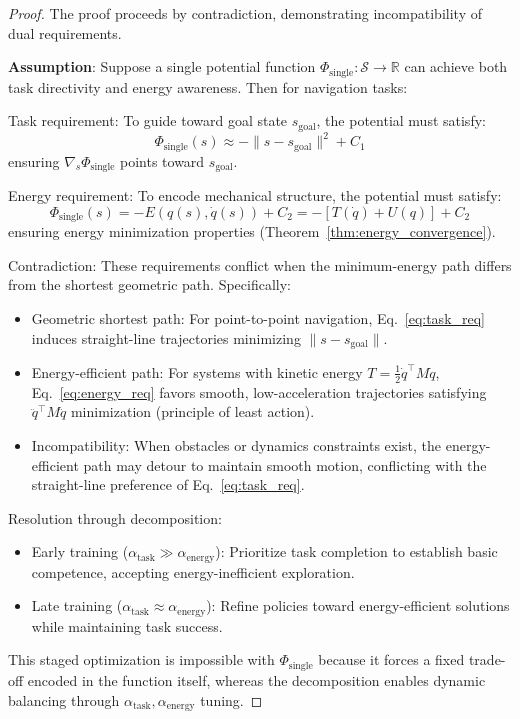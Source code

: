 \documentclass[10pt,a4paper]{amsart}
\begin{document}
	\begin{proof}
		The proof proceeds by contradiction, demonstrating incompatibility of dual requirements.
		
		\textbf{Assumption}: Suppose a single potential function $\Phi_{\text{single}}:\mathcal{S}\to\mathbb{R}$ can achieve both task directivity and energy awareness. Then for navigation tasks:
		
		Task requirement: To guide toward goal state $s_{\text{goal}}$, the potential must satisfy:
		\begin{equation}
			\Phi_{\text{single}}(s) \approx -\|s - s_{\text{goal}}\|^2 + C_1
			\label{eq:task_req}
		\end{equation}
		ensuring $\nabla_s \Phi_{\text{single}}$ points toward $s_{\text{goal}}$.
		
		Energy requirement: To encode mechanical structure, the potential must satisfy:
		\begin{equation}
			\Phi_{\text{single}}(s) = -E(q(s),\dot{q}(s)) + C_2 = -\left[T(\dot{q}) + U(q)\right] + C_2
			\label{eq:energy_req}
		\end{equation}
		ensuring energy minimization properties (Theorem~\ref{thm:energy_convergence}).
		
		Contradiction: These requirements conflict when the minimum-energy path differs from the shortest geometric path. Specifically:
		
		\begin{itemize}
			\item Geometric shortest path: For point-to-point navigation, Eq.~\eqref{eq:task_req} induces straight-line trajectories minimizing $\|s-s_{\text{goal}}\|$.
			
			\item Energy-efficient path: For systems with kinetic energy $T=\frac{1}{2}\dot{q}^\top M\dot{q}$, Eq.~\eqref{eq:energy_req} favors smooth, low-acceleration trajectories satisfying $\ddot{q}^\top M\ddot{q}$ minimization (principle of least action).
			
			\item Incompatibility: When obstacles or dynamics constraints exist, the energy-efficient path may detour to maintain smooth motion, conflicting with the straight-line preference of Eq.~\eqref{eq:task_req}.
		\end{itemize}
		
		Resolution through decomposition: 
		\begin{itemize}
			\item Early training ($\alpha_{\text{task}} \gg \alpha_{\text{energy}}$): Prioritize task completion to establish basic competence, accepting energy-inefficient exploration.
			\item Late training ($\alpha_{\text{task}} \approx \alpha_{\text{energy}}$): Refine policies toward energy-efficient solutions while maintaining task success.
		\end{itemize}
		
		This staged optimization is impossible with $\Phi_{\text{single}}$ because it forces a fixed trade-off encoded in the function itself, whereas the decomposition enables dynamic balancing through $\alpha_{\text{task}}, \alpha_{\text{energy}}$ tuning.
	\end{proof}
\end{document}
